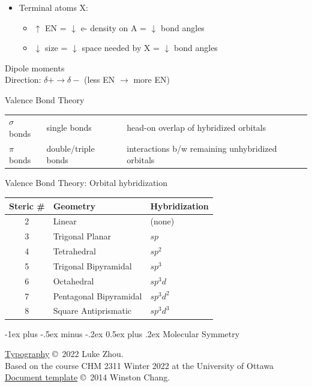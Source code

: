 \documentclass[10pt,landscape]{article}
\makeatletter
\renewcommand{\section}{\@startsection{section}{1}{0mm}%
                                {-1ex plus -.5ex minus -.2ex}%
                                {0.5ex plus .2ex}%
                                {\normalfont\large\bfseries}}
\newcommand{\extraline}{\vspace{1em}}
\newcommand{\tableindent}{\hspace{1.5em}}
\makeatother
\begin{document}
\begin{multicols}{3}
\begin{itemize}
\item Terminal atoms X: 
	\begin{itemize}
		\item $\uparrow$ EN  = $\downarrow$ e- density on A = $\downarrow$ bond angles
		\item $\downarrow$ size = $\downarrow$ space needed by X = $\downarrow$ bond angles
	\end{itemize}
\end{itemize}

Dipole moments \\
\tableindent Direction: $\delta + \rightarrow \delta -$ (less EN $\rightarrow$ more EN) 
\extraline

Valence Bond Theory

\begin{tabular}{@{\tableindent}lp{16mm}p{42mm}@{}}
$\sigma$ bonds & single bonds & head-on overlap of hybridized orbitals \\
$\pi$ bonds & double/triple bonds & interactions b/w  remaining unhybridized orbitals \\
\end{tabular}
\extraline

Valence Bond Theory: Orbital hybridization %
\vspace{-0,75em}
\begin{center}
\begin{tabular}{@{}cll@{}}
	Steric \# & Geometry & Hybridization \\ \hline
	2 & Linear & (none) \\
	3 & Trigonal Planar 
	& $sp$ \\
	4 & Tetrahedral 
	& $sp^2$ \\
	5 & Trigonal Bipyramidal 
	& $sp^3$ \\
	6 & Octahedral 
	& $sp^3d$ \\
	7 & Pentagonal Bipyramidal & $sp^3d^2$ \\ 
	8 & Square Antiprismatic & $sp^3d^3$ \\
\end{tabular}
\end{center}
\extraline


\hrulefill

\section{Molecular Symmetry}


\hrulefill


\scriptsize

\href{https://github.com/zhouluke/PhysicsFormulas}{Typography}  \copyright\ 2022 Luke Zhou. \\
Based on the course CHM 2311 Winter 2022 at the University of Ottawa \\
\href{http://wch.github.io/latexsheet/}{Document template}  \copyright\ 2014 Winston Chang.


\end{multicols}
\end{document}
